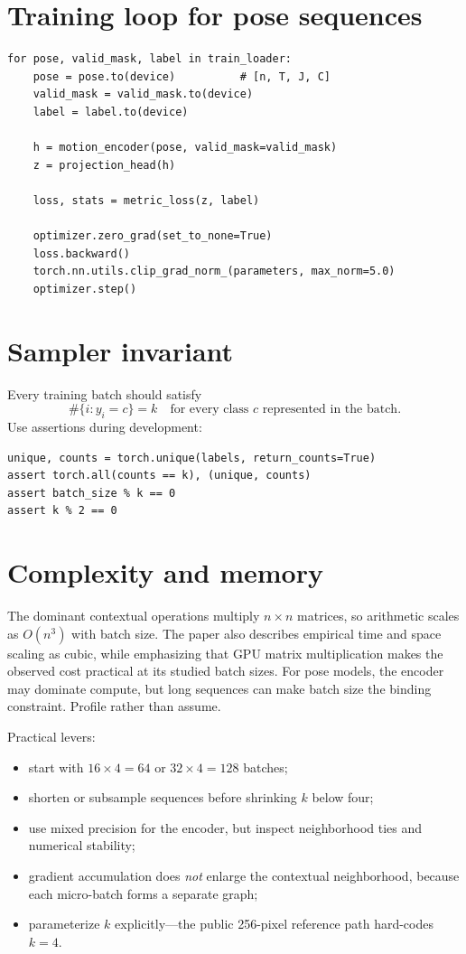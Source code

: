 \documentclass[11pt,oneside,openany]{book}
\theoremstyle{myplain}
\theoremstyle{definition}
\begin{document}
\section{Training loop for pose sequences}

\begin{lstlisting}
for pose, valid_mask, label in train_loader:
    pose = pose.to(device)          # [n, T, J, C]
    valid_mask = valid_mask.to(device)
    label = label.to(device)

    h = motion_encoder(pose, valid_mask=valid_mask)
    z = projection_head(h)

    loss, stats = metric_loss(z, label)

    optimizer.zero_grad(set_to_none=True)
    loss.backward()
    torch.nn.utils.clip_grad_norm_(parameters, max_norm=5.0)
    optimizer.step()
\end{lstlisting}

\section{Sampler invariant}

Every training batch should satisfy
\begin{equation}
  \#\{i:y_i=c\}=k
  \quad\text{for every class }c\text{ represented in the batch}.
  \label{eq:sampler-invariant}
\end{equation}
Use assertions during development:

\begin{lstlisting}
unique, counts = torch.unique(labels, return_counts=True)
assert torch.all(counts == k), (unique, counts)
assert batch_size % k == 0
assert k % 2 == 0
\end{lstlisting}

\section{Complexity and memory}

The dominant contextual operations multiply $n\times n$ matrices, so arithmetic scales as $O(n^3)$ with batch size. The paper also describes empirical time and space scaling as cubic, while emphasizing that GPU matrix multiplication makes the observed cost practical at its studied batch sizes. For pose models, the encoder may dominate compute, but long sequences can make batch size the binding constraint. Profile rather than assume.

Practical levers:
\begin{itemize}[leftmargin=*,itemsep=2pt]
  \item start with $16\times4=64$ or $32\times4=128$ batches;
  \item shorten or subsample sequences before shrinking $k$ below four;
  \item use mixed precision for the encoder, but inspect neighborhood ties and numerical stability;
  \item gradient accumulation does \emph{not} enlarge the contextual neighborhood, because each micro-batch forms a separate graph;
  \item parameterize $k$ explicitly---the public 256-pixel reference path hard-codes $k=4$.
\end{itemize}
\end{document}
